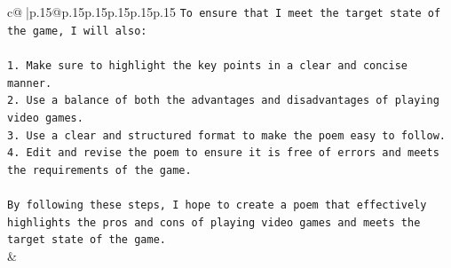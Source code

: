 \documentclass{article}
\begin{document}
{\begin{supertabular}{c@{$\;$}|p{.15\linewidth}@{}p{.15\linewidth}p{.15\linewidth}p{.15\linewidth}p{.15\linewidth}p{.15\linewidth}}
{{{\texttt{To ensure that I meet the target state of the game, I will also:} \\
\\ 
\texttt{1. Make sure to highlight the key points in a clear and concise manner.} \\
\texttt{2. Use a balance of both the advantages and disadvantages of playing video games.} \\
\texttt{3. Use a clear and structured format to make the poem easy to follow.} \\
\texttt{4. Edit and revise the poem to ensure it is free of errors and meets the requirements of the game.} \\
\\ 
\texttt{By following these steps, I hope to create a poem that effectively highlights the pros and cons of playing video games and meets the target state of the game.} \\
            }
        }
    }
    & \\ \\

\end{supertabular}
}
\end{document}
